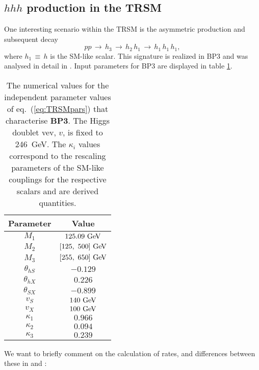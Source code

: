 \subsection{$hhh$ production in the TRSM}
One interesting scenario within the TRSM is the asymmetric production and subsequent decay
\begin{equation}\label{eq:chain}
p p \,\rightarrow\, h_3\,\rightarrow\,h_2\,h_1\,\rightarrow\,h_1\,h_1
\,h_1,
\end{equation}
where $h_1\,\equiv\,{h}$ is the SM-like scalar. This signature is realized in BP3 and was analysed in detail in \cite{Papaefstathiou:2020lyp}. Input parameters for BP3 are displayed in table \ref{tab:BP3}.
\begin{center}
\begin{table}
\centering
\begin{tabular}{cc}
Parameter & Value \\	
\hline
$M_1$ & $125.09~\rm{GeV}$\\
$M_2$ & $[125,~500]~\rm{GeV}$\\
$M_3$ & $[255,~650]~\rm{GeV}$\\
$\theta_{hS}$ & $-0.129$\\
$\theta_{hX}$ & $0.226$ \\
$\theta_{SX}$ & $-0.899$\\
$v_S$ & $140~\rm{GeV}$\\
$v_X$ & $100~\rm{GeV}$\\ \hline
$\kappa_1$ & $0.966$\\
$\kappa_2$ & $0.094$\\
$\kappa_3$ & $0.239$
\end{tabular}	
\caption{\label{tab:BP3} The numerical values for the independent parameter values of eq.~(\ref{eq:TRSMpars}) that characterise \textbf{BP3}. The Higgs doublet vev, $v$, is fixed to 246~GeV. The $\kappa_i$ values correspond to the rescaling parameters of the SM-like couplings for the respective scalars and are derived quantities.}
\end{table}
\end{center}
We want to briefly comment on the calculation of rates, and differences between these in \cite{Robens:2019kga} and \cite{Papaefstathiou:2020lyp}:
